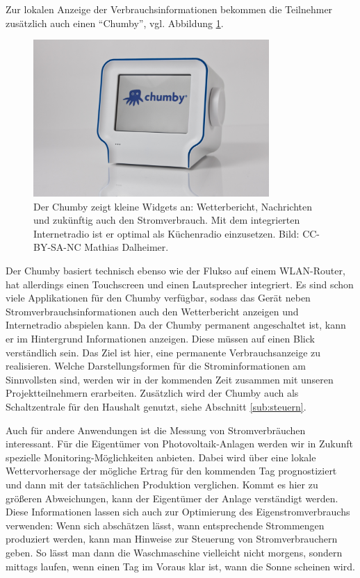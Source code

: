 \documentclass[12pt,BCOR=8.5mm]{scrartcl}
\newcommand*\imgwidth{0.8\textwidth}
\begin{document}
Zur lokalen Anzeige der Verbrauchsinformationen bekommen die Teilnehmer
zusätzlich auch einen "`Chumby"', vgl. Abbildung \ref{fig:chumby}. 
\begin{figure}[htbp]
  \begin{center}
    \includegraphics[width=\imgwidth]{figures/chumby.jpg}
    \caption{Der Chumby zeigt kleine Widgets an: Wetterbericht,
    Nachrichten und zukünftig auch den Stromverbrauch. Mit dem
    integrierten Internetradio ist er optimal als Küchenradio
    einzusetzen. Bild: CC-BY-SA-NC Mathias Dalheimer.}
    \label{fig:chumby}
  \end{center}
\end{figure}
Der Chumby basiert technisch ebenso wie der Flukso auf einem
WLAN-Router, hat allerdings einen Touchscreen und einen Lautsprecher
integriert. Es sind schon viele Applikationen für den Chumby verfügbar,
sodass das Gerät neben Stromverbrauchsinformationen auch den
Wetterbericht anzeigen und Internetradio abspielen kann. Da der Chumby
permanent angeschaltet ist, kann er im Hintergrund Informationen
anzeigen. Diese müssen auf einen Blick verständlich sein. Das Ziel ist
hier, eine permanente Verbrauchsanzeige zu realisieren.  Welche
Darstellungsformen für die Strominformationen am Sinnvollsten sind,
werden wir in der kommenden Zeit zusammen mit unseren Projektteilnehmern
erarbeiten. Zusätzlich wird der Chumby auch als Schaltzentrale für den
Haushalt genutzt, siehe Abschnitt \ref{sub:steuern}.

Auch für andere Anwendungen ist die Messung von Stromverbräuchen
interessant. Für die Eigentümer von Photovoltaik-Anlagen werden wir in
Zukunft spezielle Monitoring-Möglichkeiten anbieten. Dabei wird über
eine lokale Wettervorhersage der mögliche Ertrag für den kommenden Tag
prognostiziert und dann mit der tatsächlichen Produktion verglichen.
Kommt es hier zu größeren Abweichungen, kann der Eigentümer der Anlage
verständigt werden. Diese Informationen lassen sich auch zur Optimierung
des Eigenstromverbrauchs verwenden: Wenn sich abschätzen lässt, wann
entsprechende Strommengen produziert werden, kann man Hinweise zur
Steuerung von Stromverbrauchern geben. So lässt man dann die
Waschmaschine vielleicht nicht morgens, sondern mittags laufen, wenn
einen Tag im Voraus klar ist, wann die Sonne scheinen wird.
\end{document}
